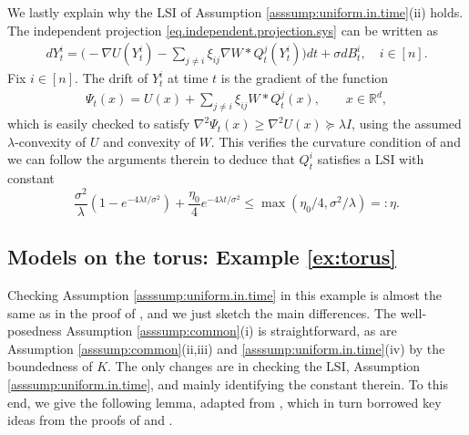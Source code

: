 \documentclass[11pt,reqno]{amsart}
\numberwithin{equation}{section}
\theoremstyle{definition}
\def\R{{\mathbb R}}
\begin{document}
We lastly explain why the LSI of Assumption \ref{asssump:uniform.in.time}(ii) holds.
The independent projection \eqref{eq.independent.projection.sys} can be written as  
\begin{align} \label{eq:ip.conv.pot}
	d Y^{i}_t = \Big(-\nabla U(Y^{i}_t) - \sum_{j \neq i} \xi_{ij} \nabla W \ast Q^{j}_t (Y^{i}_t )\Big) dt + \sigma dB^i_t, \quad i \in [n].
\end{align}
Fix $ i \in [n] $. The drift of $Y^i_t$ at time $t$ is the gradient of the function
\begin{align*}
\Psi_t(x) = U(x) +  \sum_{j \neq i} \xi_{ij}  W \ast Q^{j}_t(x), \qquad x \in \R^d,
\end{align*}
which is easily checked to satisfy $\nabla^2\Psi_t(x) \ge \nabla^2U(x) \succeq \lambda I$, using the assumed $\lambda$-convexity of $U$ and convexity of $W$.
This verifies the curvature condition of \cite[Proposition 3.12]{malrieu2001logarithmic} and we can follow the arguments therein to deduce that $ Q^i_t $ satisfies a LSI with constant
\[
\frac{\sigma^2}{\lambda}(1 - e^{-4 \lambda t/\sigma^2} ) +  \frac{\eta_0}{4}e^{-4\lambda t/\sigma^2}\le \max(\eta_0/4, \sigma^2/\lambda) =: \eta.
\]



\subsection{Models on the torus: Example \ref{ex:torus}} \label{se:proofs:torus}
Checking Assumption \ref{asssump:uniform.in.time} in this example is almost the same as in the proof of \cite[Corollary 2.9]{lacker2023sharp}, and we just sketch the main differences.
The well-posedness Assumption \ref{asssump:common}(i) is straightforward, as are Assumption \ref{asssump:common}(ii,iii) and \ref{asssump:uniform.in.time}(iv) by the boundedness of $K$. The only changes are in checking the LSI, Assumption \ref{asssump:uniform.in.time}, and mainly identifying the constant therein. To this end, we give the following lemma, adapted from \cite[Corollary 2.9]{lacker2023sharp}, which in turn borrowed key ideas from the proofs of \cite[Proposition 3.1]{carrillo2020long} and \cite[Theorem 2]{guillin2024uniform}.
\end{document}
